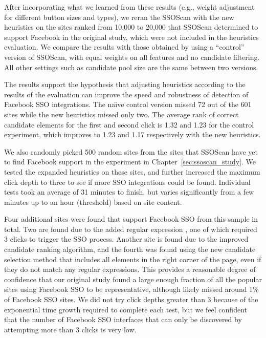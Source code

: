 After incorporating what we learned from these results (e.g., weight adjustment for different button sizes and types), we reran the SSOScan with the new heuristics on the sites ranked from 10,000 to 20,000 that SSOScan determined to support Facebook in the original study, which were not included in the heuristics evaluation.  We compare the results with those obtained by using a ``control'' version of SSOScan, with equal weights on all features and no candidate filtering.  All other settings such as candidate pool size are the same between two versions.

The results support the hypothesis that adjusting heu\-ri\-stics according to the results of the evaluation can improve the speed and robustness of detection of Facebook SSO integrations.  The na\"{\i}ve control version missed 72 out of the 601 sites while the new heuristics missed only two.  The average rank of correct candidate elements for the first and second click is 1.32 and 1.23 for the control experiment, which improves to 1.23 and 1.17 respectively with the new heuristics.

We also randomly picked 500 random sites from the sites that SSOScan have yet to find Facebook support in the experiment in Chapter~\ref{sec:ssoscan_study}.  We tested the expanded heuristics on these sites, and further increased the maximum click depth to three to see if more SSO integrations could be found.  Individual tests took an average of 31 minutes to finish, but varies significantly from a few minutes up to an hour (threshold) based on site content.

Four additional sites were found that support Facebook SSO from this sample in total.  Two are found due to the added regular expression \code{[Ff][Oo][Rr][Uu][Mm]}, one of which required 3 clicks to trigger the SSO process.  Another site is found due to the improved candidate ranking algorithm, and the fourth was found using the new candidate selection method that includes all elements in the right corner of the page, even if they do not match any regular expressions.  This provides a reasonable degree of confidence that our original study found a large enough fraction of all the popular sites using Facebook SSO to be representative, although likely missed around 1\% of Facebook SSO sites.  We did not try click depths greater than 3 because of the exponential time growth required to complete each test, but we feel confident that the number of Facebook SSO interfaces that can only be discovered by attempting more than 3 clicks is very low.

